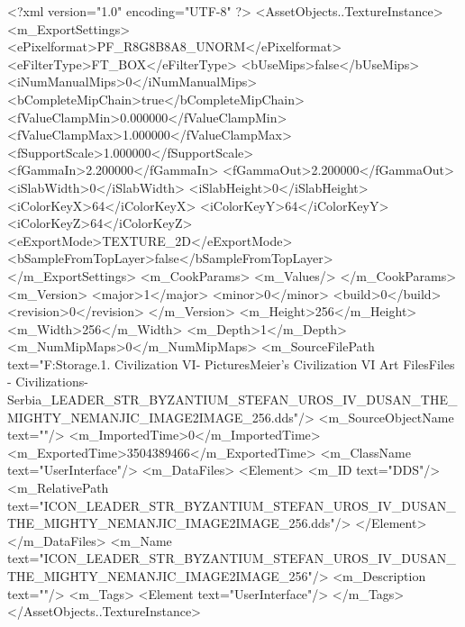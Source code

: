 <?xml version="1.0" encoding="UTF-8" ?>
<AssetObjects..TextureInstance>
	<m_ExportSettings>
		<ePixelformat>PF_R8G8B8A8_UNORM</ePixelformat>
		<eFilterType>FT_BOX</eFilterType>
		<bUseMips>false</bUseMips>
		<iNumManualMips>0</iNumManualMips>
		<bCompleteMipChain>true</bCompleteMipChain>
		<fValueClampMin>0.000000</fValueClampMin>
		<fValueClampMax>1.000000</fValueClampMax>
		<fSupportScale>1.000000</fSupportScale>
		<fGammaIn>2.200000</fGammaIn>
		<fGammaOut>2.200000</fGammaOut>
		<iSlabWidth>0</iSlabWidth>
		<iSlabHeight>0</iSlabHeight>
		<iColorKeyX>64</iColorKeyX>
		<iColorKeyY>64</iColorKeyY>
		<iColorKeyZ>64</iColorKeyZ>
		<eExportMode>TEXTURE_2D</eExportMode>
		<bSampleFromTopLayer>false</bSampleFromTopLayer>
	</m_ExportSettings>
	<m_CookParams>
		<m_Values/>
	</m_CookParams>
	<m_Version>
		<major>1</major>
		<minor>0</minor>
		<build>0</build>
		<revision>0</revision>
	</m_Version>
	<m_Height>256</m_Height>
	<m_Width>256</m_Width>
	<m_Depth>1</m_Depth>
	<m_NumMipMaps>0</m_NumMipMaps>
	<m_SourceFilePath text="F:\Mod Storage\2.1. Civilization VI\Mods\Archive - Pictures\Sid Meier's Civilization VI Art Files\Art Files - Civilizations\Civilization - Serbia\ICON_LEADER_STR_BYZANTIUM_STEFAN_UROS_IV_DUSAN_THE_MIGHTY_NEMANJIC_IMAGE2IMAGE_256.dds"/>
	<m_SourceObjectName text=""/>
	<m_ImportedTime>0</m_ImportedTime>
	<m_ExportedTime>3504389466</m_ExportedTime>
	<m_ClassName text="UserInterface"/>
	<m_DataFiles>
		<Element>
			<m_ID text="DDS"/>
			<m_RelativePath text="ICON_LEADER_STR_BYZANTIUM_STEFAN_UROS_IV_DUSAN_THE_MIGHTY_NEMANJIC_IMAGE2IMAGE_256.dds"/>
		</Element>
	</m_DataFiles>
	<m_Name text="ICON_LEADER_STR_BYZANTIUM_STEFAN_UROS_IV_DUSAN_THE_MIGHTY_NEMANJIC_IMAGE2IMAGE_256"/>
	<m_Description text=""/>
	<m_Tags>
		<Element text="UserInterface"/>
	</m_Tags>
</AssetObjects..TextureInstance>

